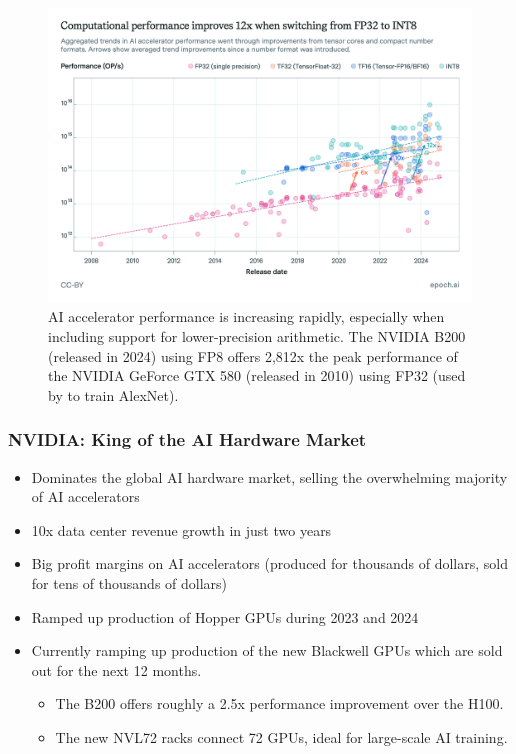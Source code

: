 \documentclass[aspectratio=169]{beamer}
\begin{document}
    \begin{frame}
        \begin{figure}
            \includegraphics[height=0.45\textwidth]{images/hardware-performance-trend}
            \caption{AI accelerator performance is increasing rapidly, especially when including support for lower-precision arithmetic. The NVIDIA B200 (released in 2024) using FP8 offers 2,812x the peak performance of the NVIDIA GeForce GTX 580 (released in 2010) using FP32 (used by \textcite{NIPS2012_c399862d} to train AlexNet).~\parencite{epoch_ai_performance_2024}}
        \end{figure}
    \end{frame}
    \begin{frame}
        \frametitle{NVIDIA: King of the AI Hardware Market}
        \begin{itemize}
            \item Dominates the global AI hardware market, selling the overwhelming majority of AI accelerators
            \item 10x data center revenue growth in just two years
            \item Big profit margins on AI accelerators (produced for thousands of dollars, sold for tens of thousands of dollars)
            \item Ramped up production of Hopper GPUs during 2023 and 2024
            \item Currently ramping up production of the new Blackwell GPUs which are sold out for the next 12 months.~\parencite{tweaktown_nvidia_2024}
            \begin{itemize}
                \item The B200 offers roughly a 2.5x performance improvement over the H100.
                \item The new NVL72 racks connect 72 GPUs, ideal for large-scale AI training.
            \end{itemize}
        \end{itemize}
    \end{frame}
\end{document}
